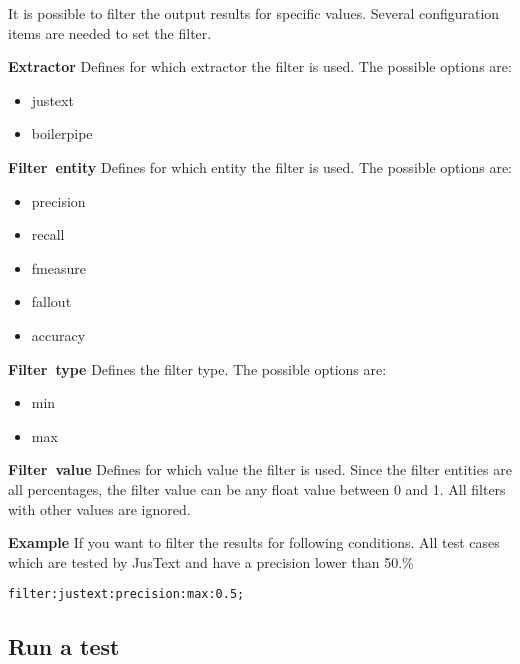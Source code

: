 It is possible to filter the output results for specific values. Several configuration items are needed to set the filter.

\textbf{Extractor} \linebreak
Defines for which extractor the filter is used. The possible options are:
\begin{itemize}
\item justext
\item boilerpipe
\end{itemize}

\mbox{\textbf{Filter entity}} \linebreak
Defines for which entity the filter is used. The possible options are:
\begin{itemize}
\item precision
\item recall
\item fmeasure
\item fallout
\item accuracy
\end{itemize}

\mbox{\textbf{Filter type}} \linebreak
Defines the filter type. The possible options are:
\begin{itemize}
\item{min}
\item{max}
\end{itemize}

\mbox{\textbf{Filter value}} \linebreak
Defines for which value the filter is used. Since the filter entities are all percentages, the filter value can be any float value between 0 and 1. All filters with other values are ignored.


\textbf{Example} \linebreak
If you want to filter the results for following conditions. All test cases which are tested by JusText and have a precision lower than 50.\% 

\begin{lstlisting}
filter:justext:precision:max:0.5;
\end{lstlisting}

\subsection{Run a test}

